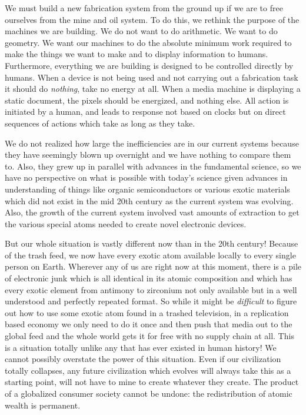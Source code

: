 We must build a new fabrication system from the ground up if we are to
free ourselves from the mine and oil system. To do this, we rethink the
purpose of the machines we are building. We do not want to do
arithmetic. We want to do geometry. We want our machines to do the
absolute minimum work required to make the things we want to make and to
display information to humans. Furthermore, everything we are building
is designed to be controlled directly by humans. When a device is not
being used and not carrying out a fabrication task it should do
\emph{nothing}, take no energy at all. When a media machine is
displaying a static document, the pixels should be energized, and
nothing else. All action is initiated by a human, and leads to response
not based on clocks but on direct sequences of actions which take as
long as they take.

We do not realized how large the inefficiencies are in our current
systems because they have seemingly blown up overnight and we have
nothing to compare them to. Also, they grew up in parallel with advances
in the fundamental science, so we have no perspective on what is
possible with today's science given advances in understanding of things
like organic semiconductors or various exotic materials which did not
exist in the mid 20th century as the current system was evolving. Also,
the growth of the current system involved vast amounts of extraction to
get the various special atoms needed to create novel electronic devices.

But our whole situation is vastly different now than in the 20th
century! Because of the trash feed, we now have every exotic atom
available locally to every single person on Earth. Wherever any of us
are right now at this moment, there is a pile of electronic junk which
is all identical in its atomic composition and which has every exotic
element from antimony to zirconium not only available but in a well
understood and perfectly repeated format. So while it might be
\emph{difficult} to figure out how to use some exotic atom found in a
trashed television, in a replication based economy we only need to do it
once and then push that media out to the global feed and the whole world
gets it for free with no supply chain at all. This is a situation
totally unlike any that has ever existed in human history! We cannot
possibly overstate the power of this situation. Even if our civilization
totally collapses, any future civilization which evolves will always
take this as a starting point, will not have to mine to create whatever
they create. The product of a globalized consumer society cannot be
undone: the redistribution of atomic wealth is permanent.

